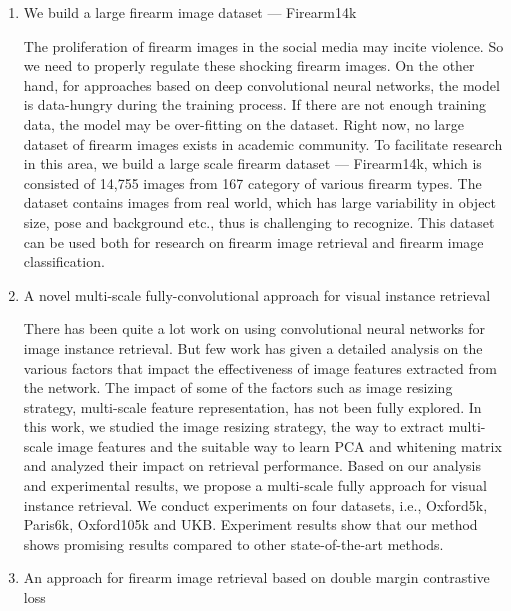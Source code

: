 \begin{enumerate}
	\item We build a large firearm image dataset --- Firearm14k

The proliferation of firearm images in the social media may incite violence. So we need to properly regulate these shocking firearm images. On the other hand, for approaches based on deep convolutional neural networks, the model is data-hungry during the training process. If there are not enough training data, the model may be over-fitting on the dataset. Right now, no large dataset of firearm images exists in academic community. To facilitate research in this area, we build a large scale firearm dataset --- Firearm14k, which is consisted of 14,755 images from 167 category of various firearm types. The dataset contains images from real world, which has large variability in object size, pose and background etc., thus is challenging to recognize. This dataset can be used both for research on firearm image retrieval and firearm image classification.

\item A novel multi-scale fully-convolutional approach for visual instance retrieval

There has been quite a lot work on using convolutional neural networks for image instance retrieval. But few work has given a detailed analysis on the various factors that impact the effectiveness of image features extracted from the network. The impact of some of the factors such as image resizing strategy, multi-scale feature representation, has not been fully explored. In this work, we studied the image resizing strategy, the way to extract multi-scale image features and the suitable way to learn PCA and whitening matrix and analyzed their impact on retrieval performance. Based on our analysis and experimental results, we propose a multi-scale fully approach for visual instance retrieval. We conduct experiments on four datasets, i.e., Oxford5k, Paris6k, Oxford105k and UKB. Experiment results show that our method shows promising results compared to other state-of-the-art methods.

\item An approach for firearm image retrieval based on double margin contrastive loss


\end{enumerate}
